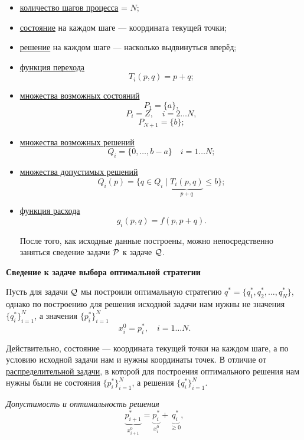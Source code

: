 \begin{itemize}[nosep]
	\item \underline{количество шагов процесса} = $N$;
	
	\item \underline{состояние} на каждом шаге --- координата текущей точки;
	
	\item \underline{решение} на каждом шаге --- насколько выдвинуться вперёд;
	
	\item \underline{функция перехода}
	\[
	T_i(p, q) = p + q;
	\]
	
	\item \underline{множества возможных состояний}
	\[
	P_1 = \{a\},
	\]
	\[
	P_i = Z, \quad i = 2 \dots N,
	\]
	\[
	P_{N+1} = \{b\};
	\]
	
	\item \underline{множества возможных решений}
	\[
	Q_i = \{0, \dots, b - a\} \quad i = 1 \dots N;
	\]
	
	\item \underline{множества допустимых решений}
	\[
	Q_i(p) = \{q \in Q_i \; \big| \; \underbrace{T_i(p, q)}_{p+q} \le b\};
	\]
	
	\item \underline{функция расхода}
	\[
	g_i(p, q) = f(p, p + q).
	\]
	
	После того, как исходные данные построены, можно непосредственно заняться сведение задачи $\P$ к задаче $\Q$.
\end{itemize}

\bigskip

\textbf{Сведение к задаче выбора оптимальной стратегии}

Пусть для задачи $\Q$ мы построили оптимальную стратегию $q^* = \{q_1^*, q_2^*, \dots, q_N^*\}$, однако по построению для решения исходной задачи нам нужны не значения $\{q_i^*\}_{i=1}^N$, а значения $\{p_i^*\}_{i=1}^{N}$
\[
x_i^0 = p_i^*, \quad i = 1 \dots N.
\]

Действительно, состояние --- координата текущей точки на каждом шаге, а по условию исходной задачи нам и нужны координаты точек. В отличие от \hyperref[pr:distribution]{распределительной задачи}, в которой для построения оптимального решения нам нужны были не состояния $\{p_i^*\}_{i=1}^N$, а решения $\{q_i^*\}_{i=1}^N$.

\bigskip

\textit{Допустимость и оптимальность решения}
\[
\underbrace{p_{i+1}^*}_{x_{i+1}^0} = \underbrace{p_i^*}_{x_i^0} + \underbrace{q_i^*}_{\ge 0},
\]

